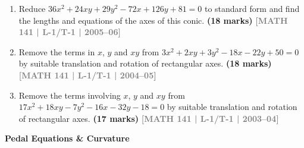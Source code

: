 \documentclass[12pt,a4paper]{article}
\newcommand{\yr}[1]{\hfill\textcolor{gray}{\small\textbf{[#1]}}}
\newcommand{\mk}[1]{\textcolor{orange!70!black}{\small\textbf{(#1 marks)}}}
\newcommand{\subtopic}[2]{%
  \vspace{10pt}
  \noindent\begin{tcolorbox}[colback=#1!8,colframe=#1,boxrule=0.6pt,arc=4pt,
    left=6pt,right=6pt,top=4pt,bottom=4pt]
    \small\bfseries\textcolor{#1}{#2}
  \end{tcolorbox}
  \vspace{2pt}
}
\begin{document}
\begin{enumerate}
\item Reduce $36x^{2}+24xy+29y^{2}-72x+126y+81=0$ to standard form and find the lengths and equations of the axes of this conic.
\mk{18} \yr{MATH 141 | L-1/T-1 | 2005--06}

\item Remove the terms in $x$, $y$ and $xy$ from $3x^{2}+2xy+3y^{2}-18x-22y+50=0$ by suitable translation and rotation of rectangular axes.
\mk{18} \yr{MATH 141 | L-1/T-1 | 2004--05}

\item Remove the terms involving $x$, $y$ and $xy$ from $17x^{2}+18xy-7y^{2}-16x-32y-18=0$ by suitable translation and rotation of rectangular axes.
\mk{17} \yr{MATH 141 | L-1/T-1 | 2003--04}

\end{enumerate}

\subtopic{cH}{Pedal Equations \& Curvature}
\label{sub:s10-pedal}
\end{document}
